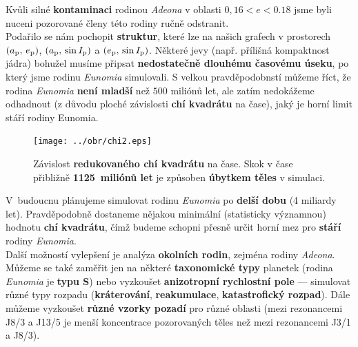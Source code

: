 \documentclass{beamer}
\newlength{\vyska}
\newlength{\vyskaC}
\newlength{\side}
\newlength{\newparskip}
\begin{document}
\begin{frame}
\begin{columns}[t]
\begin{column}{\side}
\begin{tcolorbox}[title=Stáří rodiny Eunomia\phantom{Úy},height=0.75\vyskaC]
Kvůli silné \textbf{kontaminaci} rodinou \textit{Adeona} v oblasti $0,16<e<0.18$ jsme byli nuceni pozorované členy této rodiny ručně odstranit.\\[\newparskip]

Podařilo se nám pochopit \textbf{struktur}, které lze na našich grafech v prostorech $(a_{\rm p},\,e_{\rm p})$, $(a_{\rm p},\,\sin I_{\rm p})$ a  $(e_{\rm p},\,\sin I_{\rm p})$. Některé jevy (např. přílišná kompaktnost jádra) bohužel musíme připsat \textbf{nedostatečně dlouhému časovému úseku}, po který jsme rodinu \textit{Eunomia} simulovali. S velkou pravděpodobnstí můžeme říct, že rodina \textit{Eunomia} \textbf{není mladší} než $500$ miliónů let, ale zatím nedokážeme odhadnout (z důvodu ploché závislosti \textbf{chí kvadrátu} na čase), jaký je horní limit stáří rodiny Eunomia.\\[\newparskip]

\vspace{0.5cm}

	\begin{figure}
		\centering
		\texttt{[image: ../obr/chi2.eps]}
		\captionsetup{width=0.8\linewidth}
		\caption{Závislost \textbf{redukovaného chí kvadrátu} na čase. Skok v čase přibližně \textbf{1125~miliónů let} je způsoben \textbf{úbytkem těles} v simulaci.}
	\end{figure}

\vspace{0.5cm}

	V~budoucnu plánujeme simulovat rodinu \textit{Eunomia} po \textbf{delší dobu} (4 miliardy let). Pravděpodobně dostaneme nějakou minimální (statisticky významnou) hodnotu \textbf{chí kvadrátu}, čímž budeme schopni přesně určit horní mez pro \textbf{stáří} rodiny \textit{Eunomia}.\\[\newparskip]   

	Další možností vylepšení je analýza \textbf{okolních rodin}, zejména rodiny \textit{Adeona}. %
	Můžeme se také zaměřit jen na některé \textbf{taxonomické typy} planetek (rodina \textit{Eunomia} je \textbf{typu S}) nebo vyzkoušet \textbf{anizotropní rychlostní pole} --- simulovat různé typy rozpadu (\textbf{kráterování}, \textbf{reakumulace}, \textbf{katastrofický rozpad}). Dále můžeme vyzkoušet \textbf{různé vzorky pozadí} pro různé oblasti (mezi rezonancemi J8/3 a J13/5 je menší koncentrace pozorovaných těles než mezi rezonancemi J3/1 a J8/3).\\[\newparskip]


\end{tcolorbox}
\end{column}
\end{columns}
\end{frame}
\end{document}
